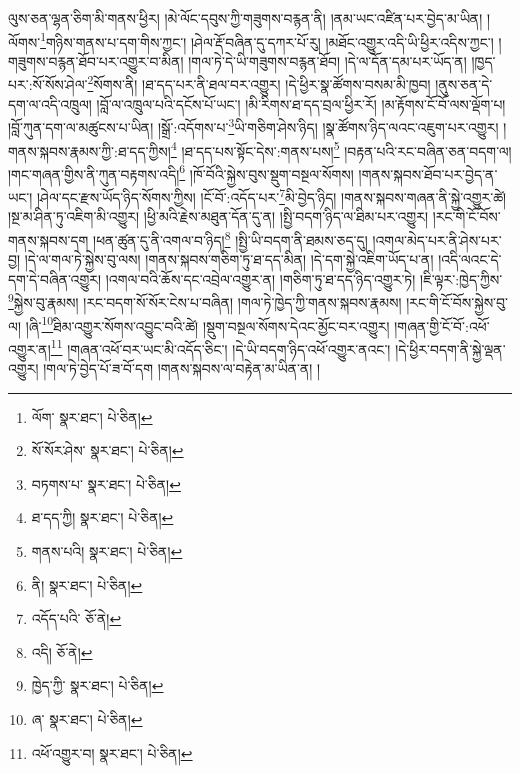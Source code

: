ལུས་ཅན་ལྷན་ཅིག་མི་གནས་ཕྱིར། །མེ་ལོང་དབུས་ཀྱི་གཟུགས་བརྙན་ནི། །ནམ་ཡང་འཛིན་པར་བྱེད་མ་ཡིན། །ལོགས་\footnote{ལོག་  སྣར་ཐང་།  པེ་ཅིན། }གཉིས་གནས་པ་དག་གིས་ཀྱང་། །ཤེལ་རྡོ་བཞིན་དུ་དཀར་པོ་རུ། །མཐོང་འགྱུར་འདི་ཡི་ཕྱིར་འདིས་ཀྱང་། །གཟུགས་བརྙན་ཐོབ་པར་འགྱུར་བ་མིན། །གལ་ཏེ་དེ་ཡི་གཟུགས་བརྙན་ཐོབ། །དེ་ལ་དོན་དམ་པར་ཡོད་ན། །ཁྱད་པར་:སོ་སོས་ཤེལ་\footnote{སོ་སོར་ཤེས་  སྣར་ཐང་།  པེ་ཅིན། }སོགས་ནི། །ཐ་དད་པར་ནི་ཐལ་བར་འགྱུར། །དེ་ཕྱིར་སྣ་ཚོགས་བསམ་མི་ཁྱབ། །ནུས་ཅན་དེ་དག་ལ་འདི་འཁྲུལ། །བློ་ལ་འཁྲུལ་པའི་དངོས་པོ་ཡང་། །མི་རིགས་ཐ་དད་བྲལ་ཕྱིར་རོ། །མ་རྟོགས་ངོ་བོ་ལས་ལྡོག་པ། །བློ་ཀུན་དག་ལ་མཚུངས་པ་ཡིན། །སྒྲོ་:འདོགས་པ་\footnote{བཏགས་པ་  སྣར་ཐང་།  པེ་ཅིན། }ཡི་གཅིག་ཤེས་ཉིད། །སྣ་ཚོགས་ཉིད་ལའང་འཇུག་པར་འགྱུར། །གནས་སྐབས་རྣམས་ཀྱི་:ཐ་དད་ཀྱིས།\footnote{ཐ་དད་ཀྱི།  སྣར་ཐང་།  པེ་ཅིན། } །ཐ་དད་པས་སྟོང་དེས་:གནས་པས།\footnote{གནས་པའི།  སྣར་ཐང་།  པེ་ཅིན། } །བརྟན་པའི་རང་བཞིན་ཅན་བདག་ལ། །གང་གཞན་གྱིས་ནི་ཀུན་བརྟགས་འདི།\footnote{ནི།  སྣར་ཐང་།  པེ་ཅིན། } །ཁོ་བོའི་སྐྱེས་བུས་སྡུག་བསྔལ་སོགས། །གནས་སྐབས་ཐོབ་པར་བྱེད་ན་ཡང་། །ཤེལ་དང་རྫས་ཡོད་ཉིད་སོགས་ཀྱིས། །ངོ་བོ་:འདོད་པར་\footnote{འདོད་པའི་  ཅོ་ནེ། }མི་བྱེད་ཉིད། །གནས་སྐབས་གཞན་ནི་སྐྱེ་འགྱུར་ཚེ། །སྔ་མ་ཤིན་ཏུ་འཇིག་མི་འགྱུར། །ཕྱི་མའི་རྗེས་མཐུན་དོན་དུ་ན། །སྤྱི་བདག་ཉིད་ལ་ཐིམ་པར་འགྱུར། །རང་གི་ངོ་བོས་གནས་སྐབས་དག །ཕན་ཚུན་དུ་ནི་འགལ་བ་ཉིད།\footnote{འདི།  ཅོ་ནེ། } །སྤྱི་ཡི་བདག་ནི་ཐམས་ཅད་དུ། །འགལ་མེད་པར་ནི་ཤེས་པར་བྱ། །དེ་ལ་གལ་ཏེ་སྐྱེས་བུ་ལས། །གནས་སྐབས་གཅིག་ཏུ་ཐ་དད་མིན། །དེ་དག་སྐྱེ་འཇིག་ཡོད་པ་ན། །འདི་ལའང་དེ་དག་དེ་བཞིན་འགྱུར། །འགལ་བའི་ཆོས་དང་འབྲེལ་འགྱུར་ན། །གཅིག་ཏུ་ཐ་དད་ཉིད་འགྱུར་ཏེ། །ཇི་ལྟར་:ཁྱེད་ཀྱིས་\footnote{ཁྱེད་ཀྱི་  སྣར་ཐང་།  པེ་ཅིན། }སྐྱེས་བུ་རྣམས། །རང་བདག་སོ་སོར་ངེས་པ་བཞིན། །གལ་ཏེ་ཁྱེད་ཀྱི་གནས་སྐབས་རྣམས། །རང་གི་ངོ་བོས་སྐྱེས་བུ་ལ། །ཞི་\footnote{ཞ་  སྣར་ཐང་།  པེ་ཅིན། }ཐིམ་འགྱུར་སོགས་འབྱུང་བའི་ཚེ། །སྡུག་བསྔལ་སོགས་དེའང་མྱོང་བར་འགྱུར། །གཞན་གྱི་ངོ་བོ་:འཕོ་འགྱུར་ན།\footnote{འཕོ་འགྱུར་བ།  སྣར་ཐང་།  པེ་ཅིན། } །གཞན་འཕོ་བར་ཡང་མི་འདོད་ཅིང་། །དེ་ཡི་བདག་ཉིད་འཕོ་འགྱུར་ནའང་། །དེ་ཕྱིར་བདག་ནི་སྐྱེ་ལྡན་འགྱུར། །གལ་ཏེ་བྱེད་པོ་ཟ་བོ་དག །གནས་སྐབས་ལ་བརྟེན་མ་ཡིན་ན། །
